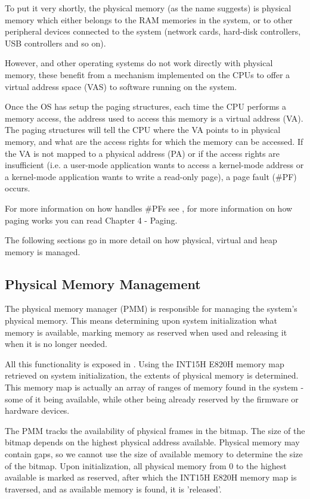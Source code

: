 \begin{appendices}
To put it very shortly, the physical memory (as the name suggests) is physical memory which either
belongs to the RAM memories in the system, or to other peripheral devices connected to the system
(network cards, hard-disk controllers, USB controllers and so on).

However, \projectname and other operating systems do not work directly with physical memory, these
benefit from a mechanism implemented on the CPUs to offer a virtual address space (VAS) to software
running on the system.

Once the OS has setup the paging structures, each time the CPU performs a memory access, the address
used to access this memory is a virtual address (VA). The paging structures will tell the CPU
where the VA points to in physical memory, and what are the access rights for which the memory can
be accessed. If the VA is not mapped to a physical address (PA) or if the access rights are
insufficient (i.e. a user-mode application wants to access a kernel-mode address or a kernel-mode
application wants to write a read-only page), a page fault (\#PF) occurs.

For more information on how \projectname handles \#PFs see , for more
information on how paging works you can read \cite{intelSys} Chapter 4 - Paging.

The following sections go in more detail on how physical, virtual and heap memory is managed.

\subsection{Physical Memory Management}

The physical memory manager (PMM) is responsible for managing the system's physical memory. This
means determining upon system initialization what memory is available, marking memory as reserved
when used and releasing it when it is no longer needed.

All this functionality is exposed in . Using the INT15H E820H memory map retrieved on
system initialization, the extents of physical memory is determined. This memory map is actually an
array of ranges of memory found in the system - some of it being available, while other being already
reserved by the firmware or hardware devices.

The PMM tracks the availability of physical frames in the  bitmap.
The size of the bitmap depends on the highest physical address available. Physical memory may 
contain gaps, so we cannot use the size of available memory to determine the size of the bitmap.
Upon initialization, all physical memory from 0 to the highest available is marked as reserved, after
which the INT15H E820H memory map is traversed, and as available memory is found, it is 'released'.


\end{appendices}

